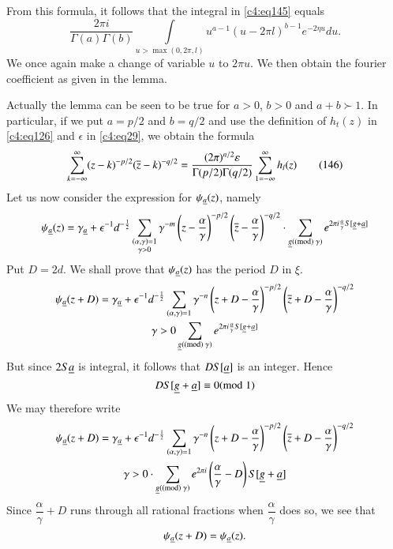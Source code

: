From this formula, it follows that the integral in \eqref{c4:eq145} equals
$$
\frac{2\pi
  i}{\Gamma(a)\Gamma(b)}\int\limits_{u>\max(0,2\pi,l)} u^{a-1}(u-2\pi
l)^{b-1}e^{-2\eta u}du.
$$
We once again make a change of variable $u$ to $2\pi u$. We then
obtain the fourier coefficient as given in the lemma.

Actually the lemma can be seen to be true for $a>0$, $b>0$ and
$a+b \succ 1$. In particular, if we put $a=p/2$ and $b=q/2$ and use the
definition of $h_{t}(z)$ in \eqref{c4:eq126} and $\epsilon$ in \eqref{c4:eq29},
we obtain the formula 
\begin{equation*}
\sum^{\infty}_{k=-\infty}(z-k)^{-p/2}
(\overline{z}-k)^{-q/2}=\frac{(2\pi)^{n/2} \varepsilon}{\Gamma(p/2)\Gamma(q/2)}
\sum^{\infty}_{1=-\infty}h_{l}(z)\tag{146}\label{c4:eq146}
\end{equation*}
Let us now consider the expression for $\psi_{\underline{a}}(z)$, namely
{\fontsize{10}{12}\selectfont
$$
\psi_{\underline{a}}(z)=\gamma_{\underline{a}}+\epsilon^{-1}d^{-\frac{1}{2}}\sum_{\substack{(\alpha,\gamma)=1\\ \gamma>0}}\gamma^{-m}\left(z-\frac{\alpha}{\gamma}\right)^{-p/2}\left(\overline{z}-\frac{\alpha}{\gamma}\right)^{-q/2}\cdot
\sum_{\underline{g}(\rm(mod) \; \gamma)}e^{2\pi i\frac{\alpha}{\gamma}S[\underline{g}+\underline{a}]}
$$}
Put $D=2d$. We shall prove that $\psi_{\underline{a}}(z)$ has the period $D$
in $\xi$. 
\begin{gather*}
\psi_{\underline{a}}(z+D)=\gamma_{\underline{a}}+\epsilon^{-1}d^{-\frac{1}{2}}\sum_{(\alpha,\gamma)=1}\gamma^{-n}\left(z+D-\frac{\alpha}{\gamma}\right)^{-p/2}\left(\overline{z}+D-\frac{\alpha}{\gamma}\right)^{-q/2}\\
\gamma>0\sum_{\underline{g}(\rm(mod) \; \gamma)}e^{2\pi i\frac{\alpha}{\gamma}S[\underline{g}+\underline{a}]}
\end{gather*}\pageoriginale
But since $2S\underline{a}$ is integral, it follows that $DS[\underline{a}]$ is an
integer. Hence
$$
DS[\underline{g}+\underline{a}]\equiv 0(\rm{mod} \; 1)
$$
We may therefore write
\begin{gather*}
\psi_{\underline{a}}(z+D)=\gamma_{\underline{a}} + \epsilon^{-1}d^{-\frac{1}{2}}
\sum_{(\alpha,\gamma)=1}\gamma^{-n}
\left(z + D-\frac{\alpha}{\gamma}\right)^{-p/2}
\left(\overline{z}+D-\frac{\alpha}{\gamma}\right)^{-q/2}\\
\gamma>0\cdot
\sum_{\underline{g}(\rm(mod) \; \gamma)}e^{2\pi
  i}\left(\frac{\alpha}{\gamma}-D\right)S[\underline{g}+\underline{a}] 
\end{gather*}
Since $\dfrac{\alpha}{\gamma}+D$ runs through all rational fractions
when $\dfrac{\alpha}{\gamma}$ does so, we see that
$$
\psi_{\underline{a}}(z+D)=\psi_{\underline{a}}(z).
$$

